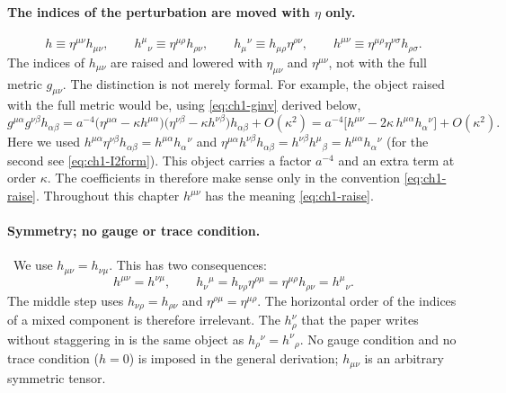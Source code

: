 \paragraph{The indices of the perturbation are moved with $\eta$ only.} \tA
\begin{equation}
h\equiv\eta^{\mu\nu}h_{\mu\nu},\qquad
h^\mu{}_\nu\equiv\eta^{\mu\rho}h_{\rho\nu},\qquad
h_\mu{}^\nu\equiv h_{\mu\rho}\eta^{\rho\nu},\qquad
h^{\mu\nu}\equiv\eta^{\mu\rho}\eta^{\nu\sigma}h_{\rho\sigma}.
\label{eq:ch1-raise}
\end{equation}
The indices of $h_{\mu\nu}$ are raised and lowered with $\eta_{\mu\nu}$ and
$\eta^{\mu\nu}$, not with the full metric $g_{\mu\nu}$. The distinction is not
merely formal. For example, the object raised with the full metric would be,
using \eqref{eq:ch1-ginv} derived below,
\begin{equation}
g^{\mu\alpha}g^{\nu\beta}h_{\alpha\beta}
=a^{-4}\big(\eta^{\mu\alpha}-\kappa h^{\mu\alpha}\big)\big(\eta^{\nu\beta}-\kappa h^{\nu\beta}\big)h_{\alpha\beta}+O(\kappa^2)
=a^{-4}\big[h^{\mu\nu}-2\kappa\,h^{\mu\alpha}h_\alpha{}^\nu\big]+O(\kappa^2).
\label{eq:ch1-fullraise}
\end{equation}
Here we used $h^{\mu\alpha}\eta^{\nu\beta}h_{\alpha\beta}=h^{\mu\alpha}h_\alpha{}^\nu$
and $\eta^{\mu\alpha}h^{\nu\beta}h_{\alpha\beta}=h^{\nu\beta}h^\mu{}_\beta=h^{\mu\alpha}h_\alpha{}^\nu$
(for the second see \eqref{eq:ch1-I2form}). This object carries a factor
$a^{-4}$ and an extra term at order $\kappa$. The coefficients in 
therefore make sense only in the convention \eqref{eq:ch1-raise}. Throughout
this chapter $h^{\mu\nu}$ has the meaning \eqref{eq:ch1-raise}.

\paragraph{Symmetry; no gauge or trace condition.} \tA\ We use
$h_{\mu\nu}=h_{\nu\mu}$. This has two consequences:
\begin{equation}
h^{\mu\nu}=h^{\nu\mu},\qquad
h_\nu{}^\mu=h_{\nu\rho}\eta^{\rho\mu}=\eta^{\mu\rho}h_{\rho\nu}=h^\mu{}_\nu .
\label{eq:ch1-symm}
\end{equation}
The middle step uses $h_{\nu\rho}=h_{\rho\nu}$ and $\eta^{\rho\mu}=\eta^{\mu\rho}$.
The horizontal order of the indices of a mixed component is therefore
irrelevant. The $h^\nu_\rho$ that the paper writes without staggering in 
is the same object as $h_\rho{}^\nu=h^\nu{}_\rho$. No gauge condition and no
trace condition ($h=0$) is imposed in the general derivation; $h_{\mu\nu}$ is an
arbitrary symmetric tensor.

